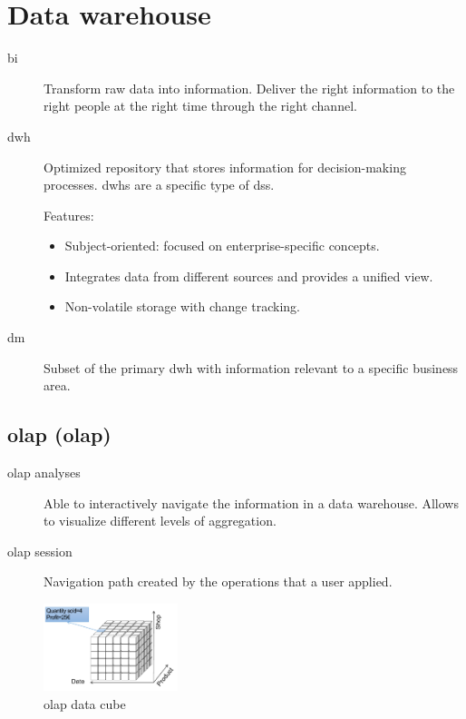\chapter{Data warehouse}


\begin{description}
    \item[\Acl{bi}] 
        Transform raw data into information.
        Deliver the right information to the right people at the right time through the right channel.

    \item[\Ac{dwh}] 
        Optimized repository that stores information for decision-making processes.
        \Acp{dwh} are a specific type of \ac{dss}.

        Features:
        \begin{itemize}
            \item Subject-oriented: focused on enterprise-specific concepts.
            \item Integrates data from different sources and provides a unified view.
            \item Non-volatile storage with change tracking. 
        \end{itemize}

    \item[\Ac{dm}] 
        Subset of the primary \ac{dwh} with information relevant to a specific business area.
\end{description}



\section{\Acl{olap} (\Acs{olap})}

\begin{description}
    \item[\ac{olap} analyses] 
        Able to interactively navigate the information in a data warehouse.
        Allows to visualize different levels of aggregation.

    \item[\ac{olap} session] 
        Navigation path created by the operations that a user applied.
\end{description}

\begin{figure}[ht]
    \centering
    \includegraphics[width=0.35\textwidth]{img/_olap_cube.pdf}
    \caption{\ac{olap} data cube}
\end{figure}


